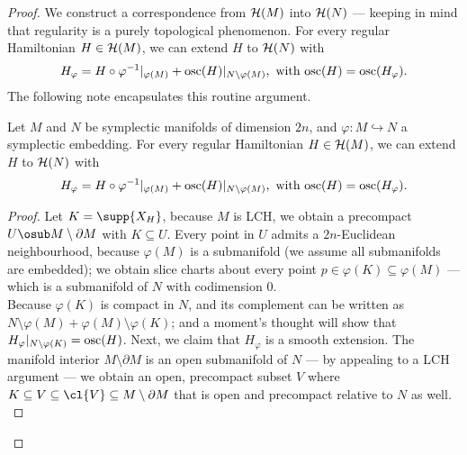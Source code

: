 \documentclass[../main-v2-manifolds.tex]{subfiles}
\begin{document}
\begin{proof}
We construct a correspondence from $\mathcal{H}(M)$ into $\mathcal{H}(N)$ --- keeping in mind that regularity is a purely topological phenomenon. For every regular Hamiltonian $H\in\mathcal{H}(M)$, we can extend $H$ to $\mathcal{H}(N)$ with
    \[
        H_{\varphi} = H\circ\varphi^{-1}\vert_{\varphi(M)} + \mathrm{osc}(H)\vert_{N\setminus \varphi(M)},\text{ with }\mathrm{osc}(H) = \mathrm{osc}(H_{\varphi}).
    \]
    The following note encapsulates this routine argument.
\begin{note}
\begin{lemma}
        Let $M$ and $N$ be symplectic manifolds of dimension $2n$, and $\varphi: M\hookrightarrow N$ a symplectic embedding. For every regular Hamiltonian $H\in\mathcal{H}(M)$, we can extend $H$ to $\mathcal{H}(N)$ with
        \[
        H_{\varphi} = H\circ\varphi^{-1}\vert_{\varphi(M)} + \mathrm{osc}(H)\vert_{N\setminus \varphi(M)},\text{ with }\mathrm{osc}(H) = \mathrm{osc}(H_{\varphi}).
        \]
\end{lemma}
\begin{proof}
    Let $K = \supp{X_H}$, because $M$ is LCH, we obtain a precompact $U\osub M\setminus\partial M$ with $K\subseteq U$. Every point in $U$ admits a $2n$-Euclidean neighbourhood, because $\varphi(M)$ is a submanifold (we assume all submanifolds are embedded); we obtain slice charts about every point $p\in \varphi(K)\subseteq\varphi(M)$ --- which is a submanifold of $N$ with codimension $0$. \\

    Because $\varphi(K)$ is compact in $N$, and its complement can be written as $N\setminus \varphi(M) + \varphi(M)\setminus\varphi(K)$; and a moment's thought will show that $H_{\varphi}\vert_{N\setminus \varphi(K)} = \mathrm{osc}(H)$. Next, we claim that $H_{\varphi}$ is a smooth extension. The manifold interior $M\setminus \partial M$ is an open submanifold of $N$ --- by appealing to a LCH argument --- we obtain an open, precompact subset $V$ where $K\subseteq V\subseteq \cl{V}\subseteq M\setminus\partial M$ that is open and precompact relative to $N$ as well.\\


\end{proof}
\end{note}
\end{proof}
\end{document}
